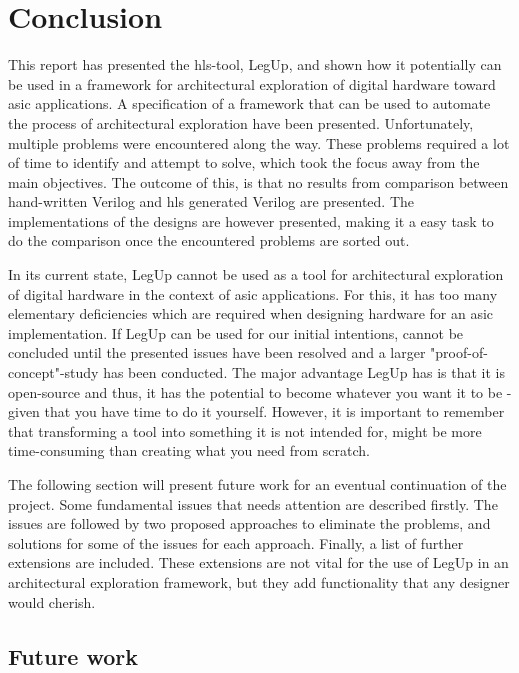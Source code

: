 \chapter{Conclusion}
\label{chp:conclusion} 
This report has presented the \gls{hls}-tool, LegUp, and shown how it potentially can be used in a framework for architectural exploration of digital hardware toward \gls{asic} applications. A specification of a framework that can be used to automate the process of architectural exploration have been presented. Unfortunately, multiple problems were encountered along the way. These problems required a lot of time to identify and attempt to solve, which took the focus away from the main objectives. The outcome of this, is that no results from comparison between hand-written Verilog and \gls{hls} generated Verilog are presented. The implementations of the designs are however presented, making it a easy task to do the comparison once the encountered problems are sorted out.

In its current state, LegUp cannot be used as a tool for architectural exploration of digital hardware in the context of \gls{asic} applications. For this, it has too many elementary deficiencies which are required when designing hardware for an \gls{asic} implementation. If LegUp can be used for our initial intentions, cannot be concluded until the presented issues have been resolved and a larger "proof-of-concept"-study has been conducted. The major advantage LegUp has is that it is open-source and thus, it has the potential to become whatever you want it to be - given that you have time to do it yourself. However, it is important to remember that transforming a tool into something it is not intended for, might be more time-consuming than creating what you need from scratch.

The following section will present future work for an eventual continuation of the project. Some fundamental issues that needs attention are described firstly. The issues are followed by two proposed approaches to eliminate the problems, and solutions for some of the issues for each approach. Finally, a list of further extensions are included. These extensions are not vital for the use of LegUp in an architectural exploration framework, but they add functionality that any designer would cherish.
\section{Future work}
\label{sec:futurework} 


